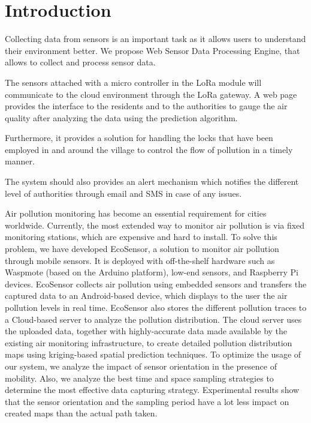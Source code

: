 \section{Introduction}


Collecting data from sensors is an important task as it allows users to understand their environment better.
We propose Web Sensor Data Processing Engine,
	that allows to collect and process sensor data.

The sensors attached with a micro controller in the LoRa module will communicate to the cloud environment through the LoRa gateway.
A web page provides the interface to the residents and to the authorities to gauge the air quality after analyzing the data using the prediction algorithm.

Furthermore,
	it provides a solution for handling the locks that have been employed in and around the village to control the flow of pollution in a timely manner.

The system should also provides an alert mechanism which notifies the different level of authorities through email and SMS in case of any issues.

Air pollution monitoring has become an essential requirement for cities worldwide.
Currently,
	the most extended way to monitor air pollution is via fixed monitoring stations,
	which are expensive and hard to install.
To solve this problem,
	we have developed EcoSensor,
	a solution to monitor air pollution through mobile sensors.
It is deployed with off-the-shelf hardware such as Waspmote (based on the Arduino platform),
	low-end sensors,
	and Raspberry Pi devices.
EcoSensor collects air pollution using embedded sensors and transfers the captured data to an Android-based device,
	which displays to the user the air pollution levels in real time.
EcoSensor also stores the different pollution traces to a Cloud-based server to analyze the pollution distribution.
The cloud server uses the uploaded data,
	together with highly-accurate data made available by the existing air monitoring infrastructure,
	to create detailed pollution distribution maps using kriging-based spatial prediction techniques.
To optimize the usage of our system,
	we analyze the impact of sensor orientation in the presence of mobility.
Also,
	we analyze the best time and space sampling strategies to determine the most effective data capturing strategy.
Experimental results show that the sensor orientation and the sampling period have a lot less impact on created maps than the actual path taken.



